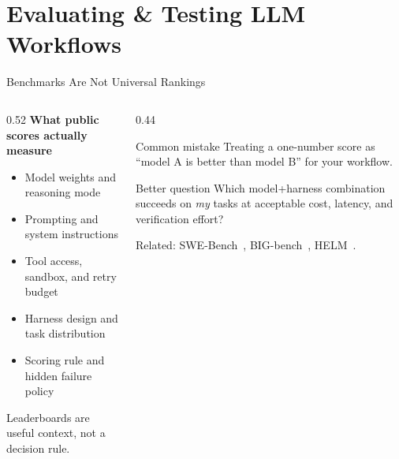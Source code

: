 
\section{Evaluating \& Testing LLM Workflows}

\begin{frame}{Benchmarks Are Not Universal Rankings}
  \begin{columns}[T, onlytextwidth]
    \begin{column}{0.52\textwidth}
      \textbf{What public scores actually measure}\\[0.3em]
      \begin{itemize}
        \item Model weights and reasoning mode
        \item Prompting and system instructions
        \item Tool access, sandbox, and retry budget
        \item Harness design and task distribution
        \item Scoring rule and hidden failure policy
      \end{itemize}
      \vspace{0.4em}
      Leaderboards are useful context, not a decision rule.
    \end{column}
    \hfill
    \begin{column}{0.44\textwidth}
      \begin{alertblock}{Common mistake}
        Treating a one-number score as ``model A is better than model B'' for your workflow.
      \end{alertblock}
      \vspace{0.4em}
      \begin{block}{Better question}
        Which model+harness combination succeeds on \emph{my} tasks at acceptable cost, latency, and verification effort?
      \end{block}
      \vspace{0.2em}
      \tiny Related: SWE-Bench~\parencite{jimenez2024swebench}, BIG-bench~\parencite{srivastava2022bigbench}, HELM~\parencite{liang2022holistic}.
    \end{column}
  \end{columns}
\end{frame}


